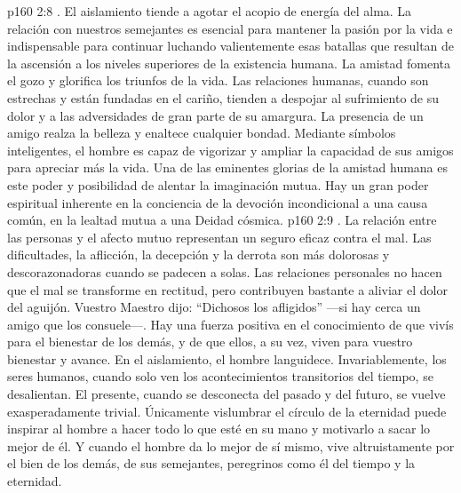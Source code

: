 \vs p160 2:8 . El aislamiento tiende a agotar el acopio de energía del alma. La relación con nuestros semejantes es esencial para mantener la pasión por la vida e indispensable para continuar luchando valientemente esas batallas que resultan de la ascensión a los niveles superiores de la existencia humana. La amistad fomenta el gozo y glorifica los triunfos de la vida. Las relaciones humanas, cuando son estrechas y están fundadas en el cariño, tienden a despojar al sufrimiento de su dolor y a las adversidades de gran parte de su amargura. La presencia de un amigo realza la belleza y enaltece cualquier bondad. Mediante símbolos inteligentes, el hombre es capaz de vigorizar y ampliar la capacidad de sus amigos para apreciar más la vida. Una de las eminentes glorias de la amistad humana es este poder y posibilidad de alentar la imaginación mutua. Hay un gran poder espiritual inherente en la conciencia de la devoción incondicional a una causa común, en la lealtad mutua a una Deidad cósmica.
\vs p160 2:9 . La relación entre las personas y el afecto mutuo representan un seguro eficaz contra el mal. Las dificultades, la aflicción, la decepción y la derrota son más dolorosas y descorazonadoras cuando se padecen a solas. Las relaciones personales no hacen que el mal se transforme en rectitud, pero contribuyen bastante a aliviar el dolor del aguijón. Vuestro Maestro dijo: “Dichosos los afligidos” ---si hay cerca un amigo que los consuele---. Hay una fuerza positiva en el conocimiento de que vivís para el bienestar de los demás, y de que ellos, a su vez, viven para vuestro bienestar y avance. En el aislamiento, el hombre languidece. Invariablemente, los seres humanos, cuando solo ven los acontecimientos transitorios del tiempo, se desalientan. El presente, cuando se desconecta del pasado y del futuro, se vuelve exasperadamente trivial. Únicamente vislumbrar el círculo de la eternidad puede inspirar al hombre a hacer todo lo que esté en su mano y motivarlo a sacar lo mejor de él. Y cuando el hombre da lo mejor de sí mismo, vive altruistamente por el bien de los demás, de sus semejantes, peregrinos como él del tiempo y la eternidad.
